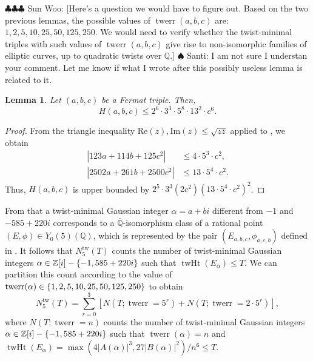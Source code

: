 \documentclass[12pt]{amsart}
\newcounter{counter}[section] %
\numberwithin{equation}{section} %
\newtheorem{lemma}[counter]{Lemma}
\theoremstyle{definition} \newtheorem{definition}[counter]{Definition}
\theoremstyle{remark} \newtheorem{nonexam}[counter]{Non-example}
\newcommand{\ZZ}{\mathbb{Z}} %
\newcommand{\QQ}{\mathbb{Q}} %
\newcommand{\Qbar}{\bar{\QQ}} %
\newcommand{\brk}[1]{\left\lbrace #1 \right\rbrace} %
\renewcommand{\Re}{\mathrm{Re}} %
\renewcommand{\Im}{\mathrm{Im}} %
\newcommand{\ol}{\overline}
\let\originalleft\left \let\originalright\right
\renewcommand{\left}{\mathopen{}\mathclose\bgroup\originalleft}
\renewcommand{\right}{\aftergroup\egroup\originalright}
\newcommand{\santi}[1]{{\color{cyan} \sf
    $\spadesuit$ Santi: #1}}
\newcommand{\spark}[1]{{\color{olive} \sf
    $\clubsuit\clubsuit\clubsuit$ Sun Woo: [#1]}}
\DeclareMathOperator{\tw}{tw} %
\DeclareMathOperator{\twht}{twHt} %
\DeclareMathOperator{\twerr}{twerr} %
\begin{document}
\spark{Here's a question we would have to figure out. Based on the two previous
  lemmas, the possible values of $\twerr(a,b,c)$ are:
  $1, 2, 5, 10, 25, 50, 125, 250$. We would need to verify whether the
  twist-minimal triples with such values of $\twerr(a,b,c)$ give rise to
  non-isomorphic families of elliptic curves, up to quadratic twists over
  $\mathbb{Q}$.} \santi{I am not sure I understan your comment. Let me know if
  what I wrote after this possibly useless lemma is related to it.}
\begin{lemma}
  Let $(a,b,c)$ be a Fermat triple. Then,
  \begin{equation}
    \label{eq:ineq}
    H(a,b,c) \leq 2^6\cdot 3^3\cdot 5^8\cdot 13^2 \cdot c^6.
  \end{equation}
\end{lemma}
\begin{proof}
  From the triangle inequality $\Re(z), \Im(z) \leq \sqrt{z\ol{z}}$ applied to
  , we obtain
  \begin{align*}
    |123a+114b+125c^2| &\leq 4\cdot 5^3\cdot c^2, \\
    |2502a+261b+2500c^2| &\leq 13\cdot 5^4\cdot c^2.
  \end{align*}
  Thus, $H(a,b,c)$ is upper bounded by
  $2^5\cdot 3^3(2c^2)(13\cdot 5^4\cdot c^2)^2$.
\end{proof}

From  that a twist-minimal Gaussian integer $\alpha = a+bi$
different from $-1$ and $-585+220i$ corresponds to a $\Qbar$-isomorphism class of a
rational point $(E,\phi) \in Y_0(5)(\QQ)$, which is represented by the pair
$(E_{a,b,c},\phi_{a,c,b})$ defined in . It follows
that $N_5^{\tw}(T)$ counts the number of twist-minimal Gaussian integers
$\alpha \in \ZZ[i]-\brk{-1,585+220i}$ such that $\twht(E_\alpha) \leq T$. We
can partition this count according to the value of $\twerr(\alpha) \in
\brk{1,2,5,10,25,50,125,250}$ to obtain
\begin{equation*}
  N_5^{\tw}(T) = \sum_{r =0}^3[N(T; \twerr = 5^r) + N(T; \twerr
  = 2\cdot 5^r)],
\end{equation*}
where $N(T;\twerr=n)$ counts the number of twist-minimal Gaussian integers
$\alpha \in \ZZ[i]-\brk{-1,585+220i}$ such that $\twerr(\alpha) = n$ and 
$\twht(E_\alpha) = \max(4|A(\alpha)|^3,27|B(\alpha)|^2)/n^6 \leq T$. 


\clearpage
{} 
\end{document}
